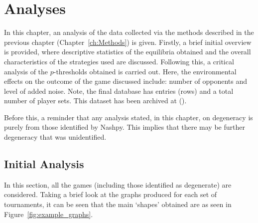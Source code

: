 \chapter{Analyses}\label{ch:Analysis}
In this chapter, an analysis of the data collected via the methods described in
the previous chapter (Chapter~\ref{ch:Methods}) is given. Firstly, a brief
initial overview is provided, where descriptive statistics of the equilibria
obtained and the overall characteristics of the strategies used are discussed.
Following this, a critical analysis of the \(p\)-thresholds obtained is carried
out. Here, the environmental effects on the outcome of the game discussed
include: number of opponents and level of added noise. Note, the final database
has
 entries (rows) and a total number of 
 player
sets. This dataset has been archived at ().

Before this, a reminder that any analysis stated, in this chapter, on degeneracy
is purely from those identified by Nashpy. This implies that there may be
further degeneracy that was unidentified.

\section{Initial Analysis}\label{sec:Initial_Analysis}
In this section, all the games (including those identified as degenerate)
are considered. Taking a brief look at the graphs produced for each set of
tournaments, it can be seen that the main `shapes' obtained are as seen in Figure~\ref{fig:example_graphs}.

